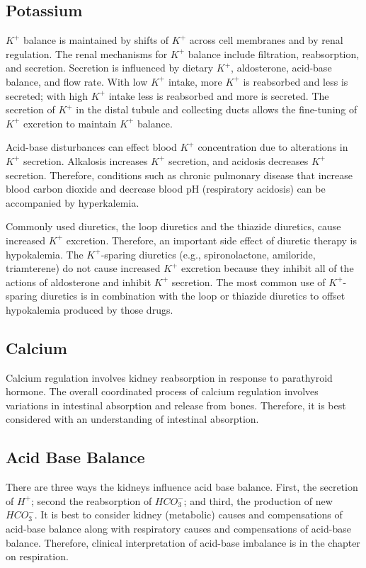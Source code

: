 \subsection{Potassium}
$K^+$ balance is maintained by shifts of $K^+$ across cell membranes and by renal regulation. The renal mechanisms for $K^+$ balance include filtration, reabsorption, and secretion. Secretion is influenced by dietary $K^+$, aldosterone, acid-base balance, and flow rate. With low $K^+$ intake, more $K^+$ is reabsorbed and less is secreted; with high $K^+$ intake less is reabsorbed and more is secreted. The secretion of  $K^+$ in the distal tubule and collecting ducts allows the fine-tuning of $K^+$ excretion to maintain $K^+$ balance.

Acid-base disturbances can effect blood $K^+$ concentration due to alterations in $K^+$ secretion. Alkalosis increases $K^+$ secretion, and acidosis decreases $K^+$ secretion. Therefore, conditions such as chronic pulmonary disease that increase blood carbon dioxide and decrease blood pH (respiratory acidosis) can be accompanied by hyperkalemia. 

Commonly used diuretics, the loop diuretics and the thiazide diuretics, cause increased $K^+$ excretion. Therefore, an important side effect of diuretic therapy is hypokalemia. The $K^+$-sparing diuretics (e.g., spironolactone, amiloride, triamterene) do not cause increased $K^+$ excretion because they inhibit all of the actions of aldosterone and inhibit $K^+$ secretion. The most common use of $K^+$-sparing diuretics is in combination with the loop or thiazide diuretics to offset hypokalemia produced by those drugs. 

\subsection{Calcium}
Calcium regulation involves kidney reabsorption in response to parathyroid hormone. The overall coordinated process of calcium regulation involves variations in intestinal absorption and release from bones. Therefore, it is best considered with an understanding of intestinal absorption.

\subsection{Acid Base Balance}
There are three ways the kidneys influence acid base balance. First, the secretion of $H^+$; second the reabsorption of $HCO_3^-$; and third, the production of new $HCO_3^-$. It is best to consider kidney (metabolic) causes and compensations of acid-base balance along with respiratory causes and compensations of acid-base balance. Therefore, clinical interpretation of acid-base imbalance is in the chapter on respiration.


